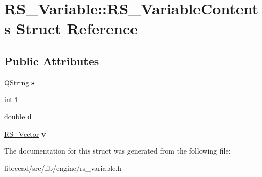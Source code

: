 \hypertarget{structRS__Variable_1_1RS__VariableContents}{\section{R\-S\-\_\-\-Variable\-:\-:R\-S\-\_\-\-Variable\-Contents Struct Reference}
\label{structRS__Variable_1_1RS__VariableContents}
}
\subsection*{Public Attributes}
\begin{DoxyCompactItemize}
\item 
\hypertarget{structRS__Variable_1_1RS__VariableContents_a59c9e5d2f336411cf0e58b7d53110750}{Q\-String {\bfseries s}}\label{structRS__Variable_1_1RS__VariableContents_a59c9e5d2f336411cf0e58b7d53110750}

\item 
\hypertarget{structRS__Variable_1_1RS__VariableContents_a42548ea164ffab1c96fb052a58a5f95a}{int {\bfseries i}}\label{structRS__Variable_1_1RS__VariableContents_a42548ea164ffab1c96fb052a58a5f95a}

\item 
\hypertarget{structRS__Variable_1_1RS__VariableContents_a704ed19b91665e9aafc6eaf291ad77a0}{double {\bfseries d}}\label{structRS__Variable_1_1RS__VariableContents_a704ed19b91665e9aafc6eaf291ad77a0}

\item 
\hypertarget{structRS__Variable_1_1RS__VariableContents_a3e98e668d092a41aec8c1ca5d2b803c8}{\hyperlink{classRS__Vector}{R\-S\-\_\-\-Vector} {\bfseries v}}\label{structRS__Variable_1_1RS__VariableContents_a3e98e668d092a41aec8c1ca5d2b803c8}

\end{DoxyCompactItemize}


The documentation for this struct was generated from the following file\-:\begin{DoxyCompactItemize}
\item 
librecad/src/lib/engine/rs\-\_\-variable.\-h\end{DoxyCompactItemize}
